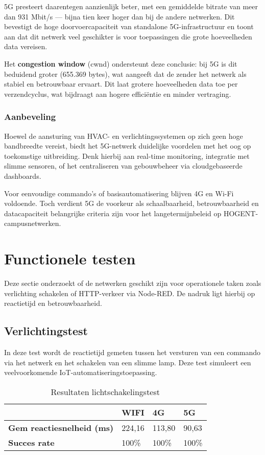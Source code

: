 5G presteert daarentegen aanzienlijk beter, met een gemiddelde bitrate van meer dan 931 Mbit/s — bijna tien keer hoger dan bij de andere netwerken. Dit bevestigt de hoge doorvoercapaciteit van standalone 5G-infrastructuur en toont aan dat dit netwerk veel geschikter is voor toepassingen die grote hoeveelheden data vereisen.

Het \textbf{congestion window} (cwnd) ondersteunt deze conclusie: bij 5G is dit beduidend groter (655.369 bytes), wat aangeeft dat de zender het netwerk als stabiel en betrouwbaar ervaart. Dit laat grotere hoeveelheden data toe per verzendcyclus, wat bijdraagt aan hogere efficiëntie en minder vertraging.

\subsubsection{Aanbeveling}
Hoewel de aansturing van HVAC- en verlichtingssystemen op zich geen hoge bandbreedte vereist, biedt het 5G-netwerk duidelijke voordelen met het oog op toekomstige uitbreiding. Denk hierbij aan real-time monitoring, integratie met slimme sensoren, of het centraliseren van gebouwbeheer via cloudgebaseerde dashboards.

Voor eenvoudige commando's of basisautomatisering blijven 4G en Wi-Fi voldoende. Toch verdient 5G de voorkeur als schaalbaarheid, betrouwbaarheid en datacapaciteit belangrijke criteria zijn voor het langetermijnbeleid op HOGENT-campusnetwerken.


\newpage
\section{Functionele testen}

Deze sectie onderzoekt of de netwerken geschikt zijn voor operationele taken zoals verlichting schakelen of HTTP-verkeer via Node-RED. De nadruk ligt hierbij op reactietijd en betrouwbaarheid.

\subsection{Verlichtingstest}

In deze test wordt de reactietijd gemeten tussen het versturen van een commando via het netwerk en het schakelen van een slimme lamp. Deze test simuleert een veelvoorkomende IoT-automatiseringstoepassing.

\begin{table}[h]
    \centering
    \begin{tabular}{l|l|l|l|}
        \cline{2-4}
        & \textbf{WIFI} & \textbf{4G} & \textbf{5G} \\ \hline
        \multicolumn{1}{|l|}{\textbf{Gem reactiesnelheid (ms)}} & 224,16        & 113,80      & 90,63       \\ \hline
        \multicolumn{1}{|l|}{\textbf{Succes rate}}              & 100\%         & 100\%       & 100\%       \\ \hline
    \end{tabular}
    \caption{Resultaten lichtschakelingstest}
\end{table}

